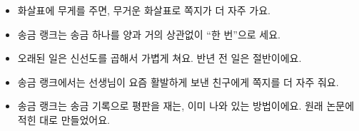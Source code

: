 \begin{learned}
\begin{itemize}
\item 화살표에 무게를 주면, 무거운 화살표로 쪽지가 더 자주 가요.
\item 송금 랭크는 송금 하나를 양과 거의 상관없이 “한 번”으로 세요.
\item 오래된 일은 신선도를 곱해서 가볍게 쳐요. 반년 전 일은 절반이에요.
\item 송금 랭크에서는 선생님이 요즘 활발하게 보낸 친구에게 쪽지를 더 자주 줘요.
\item 송금 랭크는 송금 기록으로 평판을 재는, 이미 나와 있는 방법이에요. 원래 논문에 적힌 대로 만들었어요.
\end{itemize}
\end{learned}
